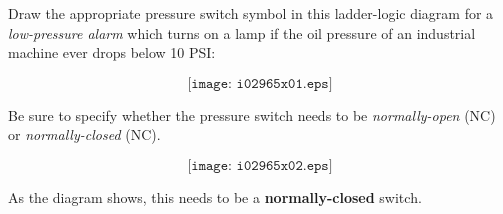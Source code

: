 

Draw the appropriate pressure switch symbol in this ladder-logic diagram for a {\it low-pressure alarm} which turns on a lamp if the oil pressure of an industrial machine ever drops below 10 PSI:

$$\texttt{[image: i02965x01.eps]}$$

Be sure to specify whether the pressure switch needs to be {\it normally-open} (NC) or {\it normally-closed} (NC).







$$\texttt{[image: i02965x02.eps]}$$

As the diagram shows, this needs to be a {\bf normally-closed} switch.











